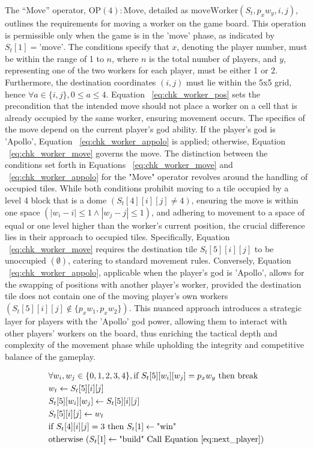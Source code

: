 \documentclass{telkomnika}
\begin{document}
The ``Move'' operator, \( \text{OP}(4):\text{Move} \), detailed as \( \text{moveWorker}(S_t, p_xw_y, i, j) \), outlines the requirements for moving a worker on the game board. This operation is permissible only when the game is in the 'move' phase, as indicated by \( S_t[1] = \text{'move'} \). The conditions specify that \( x \), denoting the player number, must be within the range of 1 to \( n \), where \( n \) is the total number of players, and \( y \), representing one of the two workers for each player, must be either 1 or 2. Furthermore, the destination coordinates \( (i, j) \) must lie within the 5x5 grid, hence \( \forall a \in \{i, j\}, 0 \leq a \leq 4 \). Equation ~\ref{eq:chk_worker_pos} sets the precondition that the intended move should not place a worker on a cell that is already occupied by the same worker, ensuring movement occurs. The specifics of the move depend on the current player's god ability. If the player's god is 'Apollo', Equation  ~\ref{eq:chk_worker_appolo} is applied; otherwise, Equation  ~\ref{eq:chk_worker_move} governs the move. The distinction between the conditions set forth in Equations  ~\ref{eq:chk_worker_move} and ~\ref{eq:chk_worker_appolo} for the "Move" operator revolves around the handling of occupied tiles. While both conditions prohibit moving to a tile occupied by a level 4 block that is a dome \(( S_t[4][i][j] \neq 4 )\), ensuring the move is within one space \( (\left| w_i - i \right| \leq 1 \land \left| w_j - j \right| \leq 1 ) \), and adhering to movement to a space of equal or one level higher than the worker's current position, the crucial difference lies in their approach to occupied tiles. Specifically, Equation ~\ref{eq:chk_worker_move} requires the destination tile \( S_t[5][i][j] \) to be unoccupied \( (\emptyset) \), catering to standard movement rules. Conversely, Equation ~\ref{eq:chk_worker_appolo}, applicable when the player's god is 'Apollo', allows for the swapping of positions with another player's worker, provided the destination tile does not contain one of the moving player's own workers \( (S_t[5][i][j] \notin \{p_xw_1, p_xw_2\}) \). This nuanced approach introduces a strategic layer for players with the 'Apollo' god power, allowing them to interact with other players' workers on the board, thus enriching the tactical depth and complexity of the movement phase while upholding the integrity and competitive balance of the gameplay.

\begin{equation}
 \begin{aligned}
    &\forall w_i, w_j \in \{0,1,2,3,4\},\text{if } S_t[5][w_i][w_j] = p_x w_y \text{ then break}\\
    &w_t \leftarrow S_t[5][i][j]\\
    &S_t[5][w_i][w_j]\leftarrow S_t[5][i][j]\\
    &S_t[5][i][j] \leftarrow w_t \\
    &\text{if } S_t[4][i][j]=3\text{ then } S_t[1] \leftarrow \text{"win"}\\
    &\text{otherwise } (S_t[1] \leftarrow \text{"build" Call Equation~\ref{eq:next_player}})
 \end{aligned}
\label{eq:worker_move}
\end{equation}
\end{document}
